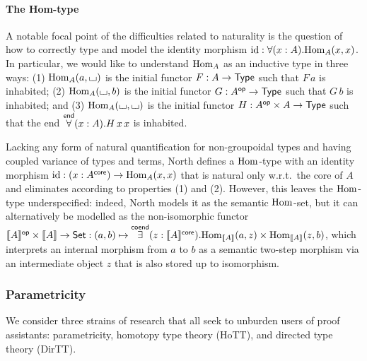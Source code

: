\documentclass[twoLevelNum]{higherStructures} %
\begin{document}
\paragraph{The Hom-type}
A notable focal point of the difficulties related to naturality is the question of how to correctly type and model the identity morphism $\mathrm{id}: \forall(x : A).{\mathrm{Hom}}_A(x, x)$.
In particular, we would like to understand ${\mathrm{Hom}}_A$ as an inductive type in three ways: (1) ${\mathrm{Hom}}_A(a, {\llcorner\hspace{-.4ex}\lrcorner})$ is the initial functor $F : A \to {\mathsf{Type}}$ such that $F\,a$ is inhabited; (2) ${\mathrm{Hom}}_A({\llcorner\hspace{-.4ex}\lrcorner}, b)$ is the initial functor $G : A^{\mathsf{op}} \to {\mathsf{Type}}$ such that $G\,b$ is inhabited; and (3) ${\mathrm{Hom}}_A({\llcorner\hspace{-.4ex}\lrcorner}, {\llcorner\hspace{-.4ex}\lrcorner})$ is the initial functor $H : A^{\mathsf{op}} \times A \to {\mathsf{Type}}$ such that the end $\overset{\mathsf{end}}{\forall}(x : A).H\,x\,x$ is inhabited.

Lacking any form of natural quantification for non-groupoidal types and having coupled variance of types and terms, North \cite{north-dirhott} defines a ${\mathrm{Hom}}$-type with an identity morphism $\mathrm{id} : (x : A^{\mathsf{core}}) \to {\mathrm{Hom}}_A(x, x)$ that is natural only w.r.t.\ the core of $A$ and eliminates according to properties (1) and (2).
However, this leaves the ${\mathrm{Hom}}$-type underspecified:
indeed, North models it as the semantic ${\mathrm{Hom}}$-set, but it can alternatively be modelled as the non-isomorphic functor $\mathopen{}\left\llbracket A \right\rrbracket\mathclose{}^{\mathsf{op}} \times \mathopen{}\left\llbracket A \right\rrbracket\mathclose{} \to {\mathsf{Set}} : (a, b) \mapsto \overset{\mathsf{coend}}{\exists}(z : \mathopen{}\left\llbracket A \right\rrbracket\mathclose{}^{\mathsf{core}}).{\mathrm{Hom}}_{\mathopen{}\left\llbracket A \right\rrbracket\mathclose{}}(a, z) \times {\mathrm{Hom}}_{\mathopen{}\left\llbracket A \right\rrbracket\mathclose{}}(z, b)$,
which interprets an internal morphism from $a$ to $b$ as a semantic two-step morphism via an intermediate object $z$ that is also stored up to isomorphism.


\subsubsection{Parametricity}\label{sec:intro:param}


We consider three strains of research that all seek to unburden users of proof assistants: parametricity, homotopy type theory (HoTT), and directed type theory (DirTT).
\end{document}
